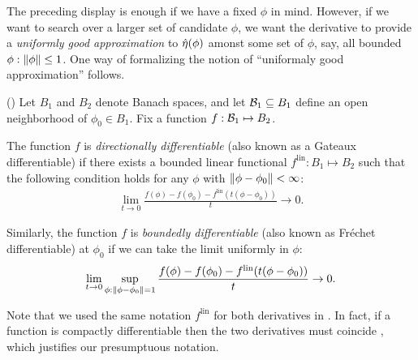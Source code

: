 The preceding display is enough if we have a fixed $\phi$ in mind.  However, if
we want to search over a larger set of candidate $\phi$, we want the derivative
to provide a {\em uniformly good approximation} to $\hat\eta(\phi)$ amonst some
set of $\phi$, say, all bounded $\phi: \left\Vert\phi\right\Vert \le 1$.  One way of
formalizing the notion of ``uniformaly good approximation'' follows.

\begin{defn}
    (\citep[Definition 4.5]{zeidler:2013:functional})
%
Let $B_1$ and $B_2$ denote Banach spaces, and let $\mathcal{B}_1 \subseteq B_1$ define
an open neighborhood of $\phi_0 \in B_1$.  Fix a function $f: \mathcal{B}_1
\mapsto B_2$.

The function $f$ is {\em directionally differentiable} (also known as a Gateaux
differentiable) if there exists a bounded linear functional $f^{\mathrm{lin}}:
B_1 \mapsto B_2$ such that the following condition holds for any
$\phi$ with $\left\Vert\phi - \phi_0\right\Vert < \infty$:
%
\begin{align*}
%
\lim_{t \rightarrow 0}
    \frac{f(\phi) - f(\phi_0) -
          f^{\mathrm{lin}}(t (\phi - \phi_0) )
         }{t} \rightarrow 0.
%
\end{align*}
%

Similarly, the function $f$ is {\em boundedly differentiable} (also known as
Fr{\'echet} differentiable) at $\phi_0$ if we can take the limit uniformly in
$\phi$:
%
\begin{align*}
%
\lim_{t \rightarrow 0}
    \sup_{\phi: \norm{\phi - \phi_0} = 1}
    \frac{f(\phi) - f(\phi_0) -
          f^{\mathrm{lin}}(t (\phi - \phi_0))
         }{t} \rightarrow 0.
%
\end{align*}
%
\end{defn}

Note that we used the same notation $f^{\mathrm{lin}}$ for both derivatives in
.  In fact, if a function is compactly differentiable
then the two derivatives must coincide \citep[Proposition
4.8]{zeidler:2013:functional}, which justifies our presumptuous notation.


